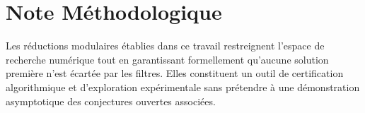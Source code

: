 \documentclass[11pt,a4paper]{article}
\begin{document}
\section{Note Méthodologique}
Les réductions modulaires établies dans ce travail restreignent l'espace de recherche numérique tout en garantissant formellement qu'aucune solution première n'est écartée par les filtres. Elles constituent un outil de certification algorithmique et d'exploration expérimentale sans prétendre à une démonstration asymptotique des conjectures ouvertes associées.
\end{document}
